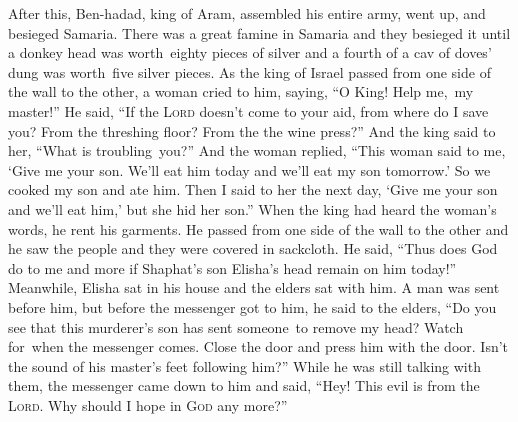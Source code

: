 \begin{inparaenum}
     After this, Ben-hadad, king of Aram, assembled his entire army, went up, and besieged Samaria.%
     There was a great famine in Samaria and they besieged it until a donkey head was worth\understood\ eighty pieces of silver and a fourth of a cav of doves' dung was worth\understood\ five silver pieces.%
     As the king of Israel passed from one side of the wall to the other, a woman cried to him, saying, ``O King! Help me,\understood\ my master!''%
     He said, ``If the \textsc{Lord} doesn't come to your aid, from where do I save you? From the threshing floor? From the the wine press?''%
     And the king said to her, ``What is troubling\understood\ you?'' And the woman replied, ``This woman said to me, `Give me your son. We'll eat him today and we'll eat my son tomorrow.'%
     So we cooked my son and ate him. Then I said to her the next day, `Give me your son and we'll eat him,' but she hid her son.''%
     When the king had heard the woman's words, he rent his garments. He passed from one side of the wall to the other and he saw the people and they were covered in sackcloth.%
     He said, ``Thus does God do to me and more if Shaphat's son Elisha's head remain on him today!''%
     Meanwhile, Elisha sat in his house and the elders sat with him. A man was sent before him, but before the messenger got to him, he said to the elders, ``Do you see that this murderer's son has sent someone\understood\ to remove my head? Watch for\understood\ when the messenger comes. Close the door and press him with the door. Isn't the sound of his master's feet following him?''%
     While he was still talking with them, the messenger came down to him and said, ``Hey! This evil is from the \textsc{Lord}. Why should I hope in \textsc{God} any more?''%
\end{inparaenum}
